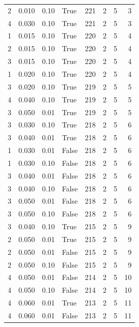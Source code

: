 \documentclass[a4paper,twoside,12pt]{book}
\begin{document}
\begin{table}
\begin{tabular}{rrrlrrrr}
				2 &  0.010 &     0.10 &     True &  221 &  2 &   5 &   3 \\
				4 &  0.030 &     0.10 &     True &  221 &  2 &   5 &   3 \\
				1 &  0.015 &     0.10 &     True &  220 &  2 &   5 &   4 \\
				2 &  0.015 &     0.10 &     True &  220 &  2 &   5 &   4 \\
				3 &  0.015 &     0.10 &     True &  220 &  2 &   5 &   4 \\
				1 &  0.020 &     0.10 &     True &  220 &  2 &   5 &   4 \\
				3 &  0.020 &     0.10 &     True &  219 &  2 &   5 &   5 \\
				4 &  0.040 &     0.10 &     True &  219 &  2 &   5 &   5 \\
				3 &  0.050 &     0.01 &     True &  219 &  2 &   5 &   5 \\
				3 &  0.030 &     0.10 &     True &  218 &  2 &   5 &   6 \\
				3 &  0.040 &     0.01 &     True &  218 &  2 &   5 &   6 \\
				1 &  0.030 &     0.01 &    False &  218 &  2 &   5 &   6 \\
				1 &  0.030 &     0.10 &    False &  218 &  2 &   5 &   6 \\
				3 &  0.040 &     0.01 &    False &  218 &  2 &   5 &   6 \\
				3 &  0.040 &     0.10 &    False &  218 &  2 &   5 &   6 \\
				3 &  0.050 &     0.01 &    False &  218 &  2 &   5 &   6 \\
				3 &  0.050 &     0.10 &    False &  218 &  2 &   5 &   6 \\
				3 &  0.040 &     0.10 &     True &  215 &  2 &   5 &   9 \\
				2 &  0.050 &     0.01 &     True &  215 &  2 &   5 &   9 \\
				2 &  0.050 &     0.01 &    False &  215 &  2 &   5 &   9 \\
				2 &  0.050 &     0.10 &    False &  215 &  2 &   5 &   9 \\
				4 &  0.050 &     0.01 &    False &  214 &  2 &   5 &  10 \\
				4 &  0.050 &     0.10 &    False &  214 &  2 &   5 &  10 \\
				4 &  0.060 &     0.01 &     True &  213 &  2 &   5 &  11 \\
				4 &  0.060 &     0.01 &    False &  213 &  2 &   5 &  11 \\

\end{tabular}
\end{table}
\end{document}
